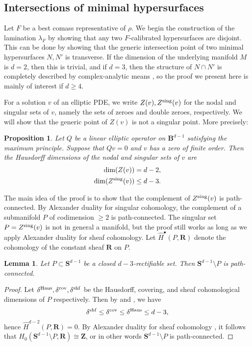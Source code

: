 \documentclass[reqno,11pt]{amsart}
\newcommand{\ZZ}{\mathbf{Z}}
\newcommand{\RR}{\mathbf{R}}
\newcommand{\Sph}{\mathbf S}
\newcommand{\Ball}{\mathbf{B}}
\newtheorem{lemma}[theorem]{Lemma}
\newtheorem{proposition}[theorem]{Proposition}
\theoremstyle{definition}
\numberwithin{equation}{section}
\begin{document}
\subsection{Intersections of minimal hypersurfaces}\label{nodal appendix}
Let $F$ be a best comass representative of $\rho$.
We begin the construction of the lamination $\lambda_F$ by showing that any two $F$-calibrated hypersurfaces are disjoint.
This can be done by showing that the generic intersection point of two minimal hypersurfaces $N, N'$ is transverse.
If the dimension of the underlying manifold $M$ is $d = 2$, then this is trivial, and if $d = 3$, then the structure of $N \cap N'$ is completely described by complex-analytic means \cite[Theorem 7.3]{colding2011course}, so the proof we present here is mainly of interest if $d \geq 4$.

For a solution $v$ of an elliptic PDE, we write $Z(v), Z^{\rm sing}(v)$ for the nodal and singular sets of $v$, namely the sets of zeroes and double zeroes, respectively.
We will show that the generic point of $Z(v)$ is not a singular point. More precisely:

\begin{proposition}\label{nodal set is generically smooth}
Let $Q$ be a linear elliptic operator on $\Ball^{d - 1}$ satisfying the maximum principle.
Suppose that $Qv = 0$ and $v$ has a zero of finite order.
Then the Hausdorff dimensions of the nodal and singular sets of $v$ are
\begin{align}
	\dim(Z(v)) &= d - 2, \label{nodal dimension}\\
	\dim(Z^{\rm sing}(v)) &\leq d - 3. \label{singular nodal dimension}
\end{align}
\end{proposition}

The main idea of the proof is to show that the complement of $Z^{\rm sing}(v)$ is path-connected.
By Alexander duality for singular cohomology, the complement of a submanifold $P$ of codimension $\geq 2$ is path-connected.
The singular set $P = Z^{\rm sing}(v)$ is not in general a manifold, but the proof still works as long as we apply Alexander duality for sheaf cohomology.
Let $\hat H^\bullet(P, \RR)$ denote the cohomology of the constant sheaf $\RR$ on $P$.

\begin{lemma}\label{closed mfld complement}
Let $P \subset \Sph^{d - 1}$ be a closed $d - 3$-rectifiable set.
Then $\Sph^{d - 1} \setminus P$ is path-connected.
\end{lemma}
\begin{proof}
Let $\delta^{\rm Haus}, \delta^{\rm cov}, \delta^{\rm shf}$ be the Hausdorff, covering, and sheaf cohomological dimensions of $P$ respectively.
Then by \cite[{\S}II.5.12]{godement1973topologie} and \cite[Theorem 6.3.10]{edgar2008measure}, we have 
$$\delta^{\rm shf} \leq \delta^{\rm cov} \leq \delta^{\rm Haus} \leq d - 3,$$
hence $\hat H^{d - 2}(P, \RR) = 0$.
By Alexander duality for sheaf cohomology \cite[Theorem 6]{Kaplan47}, it follows that $H_0(\Sph^{d - 1} \setminus P, \RR) \cong \ZZ$, or in other words $\Sph^{d - 1} \setminus P$ is path-connected.
\end{proof}
\end{document}
